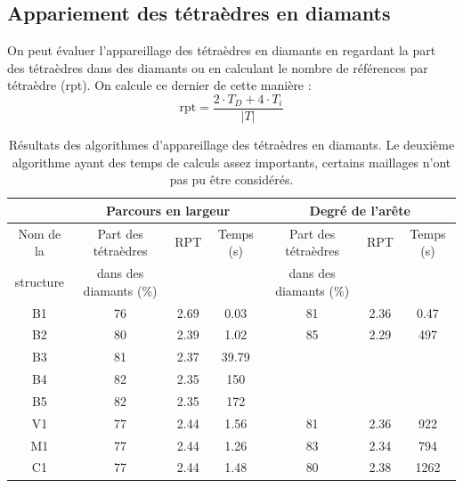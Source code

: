 \subsection{Appariement des tétraèdres en diamants}
\noindent
On peut évaluer l'appareillage des tétraèdres en diamants en regardant la part des tétraèdres dans des diamants ou en calculant le nombre de références par tétraèdre (rpt). On calcule ce dernier de cette manière :\\
\begin{equation}
\text{rpt} = \frac{2\cdot T_D+4\cdot T_i}{|T|}
\end{equation}
\begin{table}[H]
\centering
\footnotesize
\begin{tabular}{|c | c | c | c| c | c | c |}
\hline
& \multicolumn{3}{|c|}{Parcours en largeur}& \multicolumn{3}{|c|}{Degré de l'arête}\\
\hline
Nom de la & Part des tétraèdres & RPT & Temps (s) & Part des tétraèdres & RPT & Temps (s)\\
structure&dans des diamants (\%)&&&dans des diamants (\%)&&\\
\hline
B1 & 76 & 2.69 & 0.03 & 81 & 2.36 & 0.47 \\
B2 &  80 & 2.39 & 1.02 & 85 & 2.29 & 497 \\
B3 & 81& 2.37 & 39.79 &  &  &\\
B4 & 82& 2.35 & 150 &  &  &\\
B5 & 82 & 2.35 & 172 &  &  &\\
V1 & 77& 2.44 & 1.56 & 81& 2.36 & 922\\
M1 & 77& 2.44 & 1.26 & 83 & 2.34 & 794\\
C1 & 77& 2.44 & 1.48 & 80 & 2.38 & 1262\\
\hline  
\end{tabular}
\caption{Résultats des algorithmes d'appareillage des tétraèdres en diamants. Le deuxième algorithme ayant des temps de calculs assez importants, certains maillages n'ont pas pu être considérés.}
\label{tab:results_performances}
\end{table}

